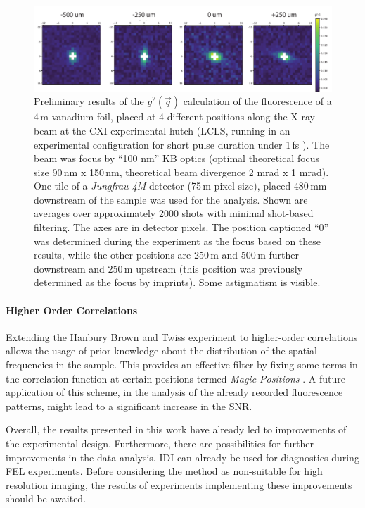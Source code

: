 \begin{figure}[p]
	\centering
	\includegraphics[width=\linewidth]{images/lv65_vanadium.pdf}
	
	\caption[Focus finding using IDI]{Preliminary results of the $g^2(\vec{q})$ calculation of the fluorescence of a 4\,\textmu m vanadium foil, placed at 4 different positions along the X-ray beam at the CXI experimental hutch (LCLS, running in an experimental configuration for short pulse duration under 1\,fs \cite{subfs2017,argosecond}). The beam was focus by \enquote{100 nm} KB optics (optimal theoretical focus size 90\,nm x 150\,nm, theoretical beam divergence 2 mrad x 1 mrad). One tile of a \textit{Jungfrau 4M} detector (75\,\textmu m pixel size), placed 480\,mm downstream of the sample was used for the analysis. Shown are averages over approximately 2000 shots with minimal shot-based filtering. The axes are in detector pixels. The position captioned \enquote{0} was determined during the experiment as the focus based on these results, while the other positions are 250\,\textmu m and 500\,\textmu m further downstream and 250\,\textmu m upstream (this position was previously determined as the focus by imprints).  Some astigmatism is visible.}
	\label{fig:outlook_vanadium}
\end{figure}

\paragraph{Higher Order Correlations}
Extending the Hanbury Brown and Twiss experiment to higher-order correlations allows the usage of prior knowledge about the distribution of the spatial frequencies in the sample. This provides an effective filter by fixing some terms in the correlation function at certain positions termed \textit{Magic Positions} \cite{schneider2018,thiel2007}. A future application of this scheme, in the analysis of the already recorded fluorescence patterns, might lead to a significant increase in the SNR.

\vspace{0.5cm}
Overall, the results presented in this work have already led to  improvements of the experimental design. Furthermore, there are possibilities for further improvements in the data analysis. IDI can already be used for diagnostics during FEL experiments. Before considering the method as non-suitable for high resolution imaging, the results of experiments implementing these improvements should be awaited.



